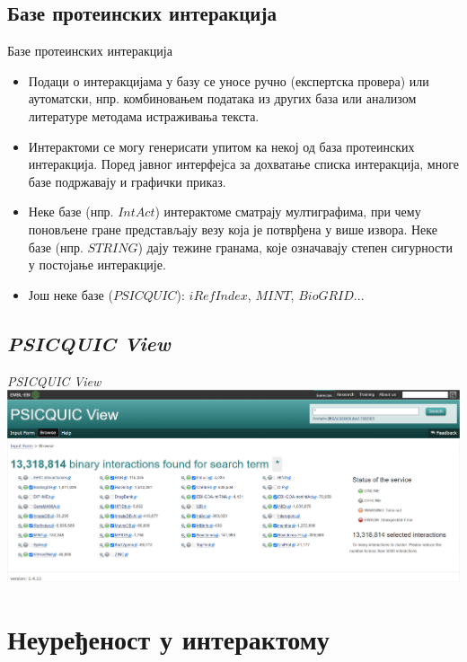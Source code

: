 \documentclass[hyperref={bookmarks=false}]{beamer}
\begin{document}
\subsection{Базе протеинских интеракција}
\begin{frame}{Базе протеинских интеракција}
\begin{itemize}
	\item Подаци о интеракцијама у базу се уносе ручно (експертска провера) или аутоматски, нпр. комбиновањем података из других база или анализом литературе методама истраживања текста.

	\item Интерактоми се могу генерисати упитом ка некој од база протеинских интеракција. Поред јавног интерфејса за дохватање списка интеракција, многе базе подржавају и графички приказ.

	\item Неке базе (нпр. $IntAct$) интерактоме сматрају мултиграфима, при чему поновљене гране представљају везу која је потврђена у више извора. Неке базе (нпр. $STRING$) дају тежине гранама, које означавају степен сигурности у постојање интеракције.

	\item Још неке базе ($PSICQUIC$): $iRefIndex$, $MINT$, $BioGRID$...
\end{itemize}
\end{frame}

\subsection{\textit{PSICQUIC View}}
\begin{frame}{\textit{PSICQUIC View}}
\centering\includegraphics[width=\textwidth]{PSICQUIC.png}
\end{frame}

\section{Неуређеност у интерактому}
\end{document}
